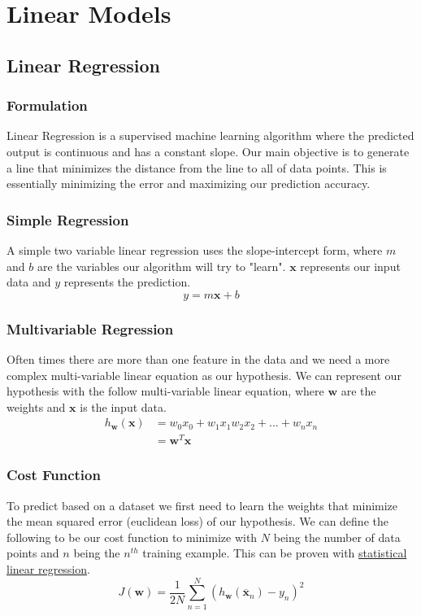 \documentclass[12pt]{article}
\begin{document}
        
\section{Linear Models}
    \subsection{Linear Regression} \label{sec:LinearRegression}
        \subsubsection{Formulation}
            Linear Regression is a supervised machine learning algorithm where the predicted output is continuous and
            has a constant slope. Our main objective is to generate a line that minimizes the distance from the line to
            all of data points. This is essentially minimizing the error and maximizing our prediction accuracy.
        
        \subsubsection{Simple Regression}
            A simple two variable linear regression uses the slope-intercept form, where $m$ and $b$ are the variables
            our algorithm will try to "learn". $\boldsymbol{x}$ represents our input data and $y$ represents the
            prediction.
            $$ y = m \boldsymbol{x} + b$$

        \subsubsection{Multivariable Regression}
            Often times there are more than one feature in the data and we need a more complex multi-variable linear
            equation as our hypothesis. We can represent our hypothesis with the follow multi-variable linear equation,
            where $\boldsymbol{w}$ are the weights and $\boldsymbol{x}$ is the input data.
            \begin{align*}
                h_{\boldsymbol{w}}(\boldsymbol{x}) &= w_0x_0 + w_1x_1 w_2x_2 + ... + w_nx_n \\
                &= \boldsymbol{w}^T\boldsymbol{x}
            \end{align*}

        \subsubsection{Cost Function}
            To predict based on a dataset we first need to learn the weights that minimize the mean squared error
            (euclidean loss) of our hypothesis. We can define the following to be our cost function to minimize with $N$
            being the number of data points and $n$ being the $n^{th}$ training example. This can be proven with
            \hyperref[sec:StatisticalLinearRegression]{statistical linear regression}.
            $$ J(\boldsymbol{w}) = \frac{1}{2N}\sum_{n=1}^{N}(h_{\boldsymbol{w}}(\overline{\boldsymbol{x}}_n) - y_n)^2
            $$
\end{document}
